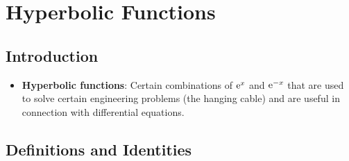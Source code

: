 \documentclass[../main.tex]{subfiles}
\begin{document}
\chapter{Hyperbolic Functions}
\section{Introduction}
\begin{itemize}
    \item {}\textbf{Hyperbolic functions}: Certain combinations of $\e[x]$ and $\e[-x]$ that are used to solve certain engineering problems (the hanging cable) and are useful in connection with differential equations.
\end{itemize}



\section{Definitions and Identities}
\end{document}
